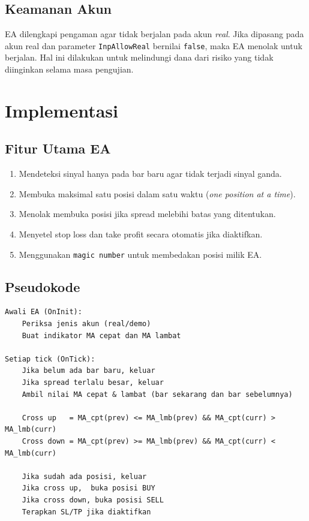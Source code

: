 \documentclass[12pt,a4paper]{article}
\begin{document}
\subsection{Keamanan Akun}
EA dilengkapi pengaman agar tidak berjalan pada akun \textit{real}. Jika dipasang pada
akun real dan parameter \texttt{InpAllowReal} bernilai \texttt{false}, maka EA menolak
untuk berjalan. Hal ini dilakukan untuk melindungi dana dari risiko yang tidak diinginkan
selama masa pengujian.

\section{Implementasi}

\subsection{Fitur Utama EA}
\begin{enumerate}
\item Mendeteksi sinyal hanya pada bar baru agar tidak terjadi sinyal ganda.
\item Membuka maksimal satu posisi dalam satu waktu (\textit{one position at a time}).
\item Menolak membuka posisi jika spread melebihi batas yang ditentukan.
\item Menyetel stop loss dan take profit secara otomatis jika diaktifkan.
\item Menggunakan \texttt{magic number} untuk membedakan posisi milik EA.
\end{enumerate}

\subsection{Pseudokode}
\begin{verbatim}
Awali EA (OnInit):
    Periksa jenis akun (real/demo)
    Buat indikator MA cepat dan MA lambat

Setiap tick (OnTick):
    Jika belum ada bar baru, keluar
    Jika spread terlalu besar, keluar
    Ambil nilai MA cepat & lambat (bar sekarang dan bar sebelumnya)

    Cross up   = MA_cpt(prev) <= MA_lmb(prev) && MA_cpt(curr) > MA_lmb(curr)
    Cross down = MA_cpt(prev) >= MA_lmb(prev) && MA_cpt(curr) < MA_lmb(curr)

    Jika sudah ada posisi, keluar
    Jika cross up,  buka posisi BUY
    Jika cross down, buka posisi SELL
    Terapkan SL/TP jika diaktifkan
\end{verbatim}
\end{document}
